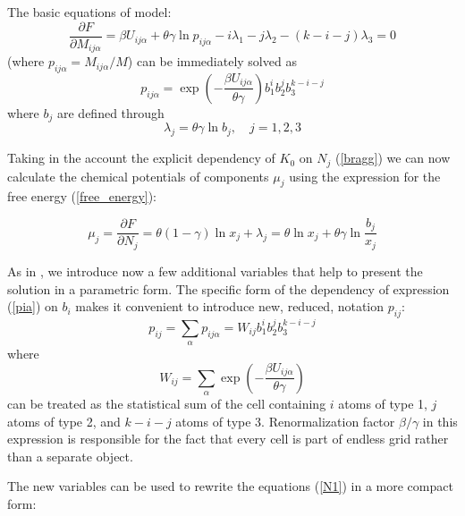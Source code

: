 \documentclass[12pt,abstract]{scrartcl}
\begin{document}
The basic equations of model:
\begin{equation} \label{basic_equation}
    \frac{\partial F}{\partial M_{i j \alpha}} = \beta U_{i j \alpha} + \theta \gamma \ln p_{i j \alpha} - i \lambda_1 - j \lambda_2 - (k-i-j) \lambda_3 = 0 
\end{equation}
(where $ p_{i j \alpha} =  M_{i j \alpha} / M$) can be immediately solved as
\begin{equation} \label{pia}
    p_{i j \alpha} = \exp \left(- {\frac{\beta U_{i j \alpha}}{\theta\gamma }}\right) b_1^i b_2^j b_3^{k-i -j}
\end{equation}
where $b_j$ are defined through
\begin{equation}
    \lambda_j = \theta \gamma \ln b_j, \quad  j = 1, 2, 3
\end{equation}

Taking in the account the explicit dependency of $K_0$ on $N_j$ (\ref{bragg}) we can now calculate the chemical potentials of components $\mu_j$ using the expression for the free energy (\ref{free_energy}):

\begin{equation} \label{chim_pot}
    \mu_j = \frac{\partial F}{\partial N_j} =  \theta (1 - \gamma) \ln x_j + \lambda_j = \theta \ln x_j + \theta \gamma \ln \frac{b_j}{x_j}
\end{equation}

As in \cite{TISR_p1}, we introduce now a few additional variables that  help to present the  solution in a parametric form.
The specific form of the dependency of expression (\ref{pia}) on $b_i$ makes it convenient to introduce  new, reduced, notation $p_{i j}$:
\begin{equation} \label{pi}
    p_{i j} = \sum_\alpha p_{i j \alpha} = W_{i j} b_1^i b_2^j b_3^{k-i-j}
\end{equation}
where
\begin{equation} \label{Wij}
    W_{i j} = \sum_\alpha \exp \left(- {\frac{\beta U_{i j \alpha}}{\theta\gamma }}\right)
\end{equation}
can be treated as the statistical sum \cite{kersonhuang2018} of the cell containing $i$ atoms of type 1, $j$ atoms of type 2, and $k-i-j$ atoms of type 3. 
Renormalization factor $\beta / \gamma$ in this expression is responsible for the fact that every cell is part of endless grid rather than a separate object.

The new variables can be used to rewrite the equations (\ref{N1})  in a more compact form:
\end{document}
